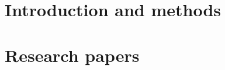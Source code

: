\documentclass[10pt,twoside,openright,b5paper]{memoir}
\begin{document}

\frontmatter

\cleardoublepage

\cleardoublepage

\cleardoublepage
\tableofcontents
\cleardoublepage
\listoffigures
\cleardoublepage
\listoftables
\cleardoublepage


\mainmatter
\part[Part I]{Introduction and methods}
\pagestyle{ruled}









\appendix



\backmatter
\printbibliography[title=References]

\makeatletter
\def\pagenumbering#1{%
  \gdef\thepage{\csname @#1\endcsname \c@page}}
\makeatother

\mainmatter
\part[Part II]{Research papers}
\pagenumbering{gobble}
\pagestyle{cleared}

\end{document}
